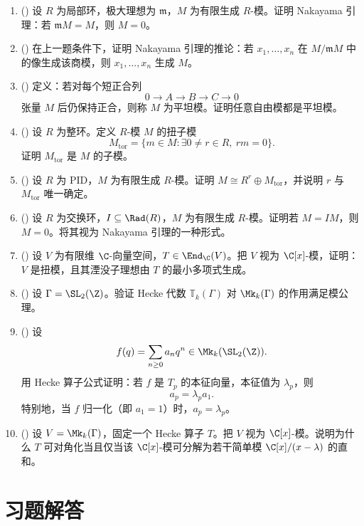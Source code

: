 \begin{enumerate}[label=\textbf{10.\arabic*.}, leftmargin=3.2em, start=46]
  \item (\hard) 设 $R$ 为局部环，极大理想为 $\mathfrak m$，$M$ 为有限生成 $R$-模。证明 Nakayama 引理：若 $\mathfrak m M=M$，则 $M=0$。

  \item (\hard) 在上一题条件下，证明 Nakayama 引理的推论：若 $x_1,\dots,x_n$ 在 $M/\mathfrak m M$ 中的像生成该商模，则 $x_1,\dots,x_n$ 生成 $M$。

  \item (\hard) 定义：若对每个短正合列
  \[
  0\to A\to B\to C\to 0
  \]
  张量 $M$ 后仍保持正合，则称 $M$ 为平坦模。证明任意自由模都是平坦模。

  \item (\hard) 设 $R$ 为整环。定义 $R$-模 $M$ 的扭子模
  \[
  M_{\mathrm{tor}}=\{m\in M:\exists 0\ne r\in R,\ rm=0\}.
  \]
  证明 $M_{\mathrm{tor}}$ 是 $M$ 的子模。

  \item (\hard) 设 $R$ 为 PID，$M$ 为有限生成 $R$-模。证明 $M\cong R^r\oplus M_{\mathrm{tor}}$，并说明 $r$ 与 $M_{\mathrm{tor}}$ 唯一确定。

  \item (\hard) 设 $R$ 为交换环，$I\subseteq \Rad(R)$，$M$ 为有限生成 $R$-模。证明若 $M=IM$，则 $M=0$。将其视为 Nakayama 引理的一种形式。

  \item (\hard) 设 $V$ 为有限维 $\C$-向量空间，$T\in \End_\C(V)$。把 $V$ 视为 $\C[x]$-模，证明：$V$ 是扭模，且其湮没子理想由 $T$ 的最小多项式生成。

  \item (\hard) 设 $\Gamma=\SL_2(\Z)$。验证 Hecke 代数 $\mathbb T_k(\Gamma)$ 对 $\Mk_k(\Gamma)$ 的作用满足模公理。

  \item (\hard) 设
  \[
  f(q)=\sum_{n\ge 0} a_nq^n\in \Mk_k(\SL_2(\Z)).
  \]
  用 Hecke 算子公式证明：若 $f$ 是 $T_p$ 的本征向量，本征值为 $\lambda_p$，则
  \[
  a_p=\lambda_p a_1.
  \]
  特别地，当 $f$ 归一化（即 $a_1=1$）时，$a_p=\lambda_p$。

  \item (\hard) 设 $V=\Mk_k(\Gamma)$，固定一个 Hecke 算子 $T$。把 $V$ 视为 $\C[x]$-模。说明为什么 $T$ 可对角化当且仅当该 $\C[x]$-模可分解为若干简单模 $\C[x]/(x-\lambda)$ 的直和。
\end{enumerate}

\section*{习题解答}

